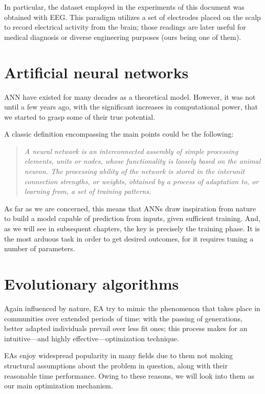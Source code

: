 	In particular, the dataset employed in the experiments of this document was obtained with \acs{EEG}. This paradigm utilizes a set of electrodes placed on the scalp to record electrical activity from the brain; those readings are later useful for medical diagnosis or diverse engineering purposes (ours being one of them).

\section{Artificial neural networks}

	\ac{ANN} have existed for many decades as a theoretical model. However, it was not until a few years ago, with the significant increases in computational power, that we started to grasp some of their true potential.

	A classic definition encompassing the main points could be the following: 

	\begin{quotation}
		\textit{A neural network is an interconnected assembly of simple processing elements, units or nodes, whose functionality is loosely based on the animal neuron. The processing ability of the network is stored in the interunit connection strengths, or weights, obtained by a process of adaptation to, or learning from, a set of training patterns. \cite{nnintro}}
	\end{quotation}

	As far as we are concerned, this means that \acs{ANN}s draw inspiration from nature to build a model capable of prediction from inputs, given sufficient training. And, as we will see in subsequent chapters, the key is precisely the training phase. It is the most arduous task in order to get desired outcomes, for it requires tuning a number of parameters.

\section{Evolutionary algorithms}

	Again influenced by nature, \ac{EA} try to mimic the phenomenon that takes place in communities over extended periods of time: with the passing of generations, better adapted individuals prevail over less fit ones; this process makes for an intuitive---and highly effective---optimization technique.

	\acs{EA}s enjoy widespread popularity in many fields due to them not making structural assumptions about the problem in question, along with their reasonable time performance. Owing to these reasons, we will look into them as our main optimization mechanism.

